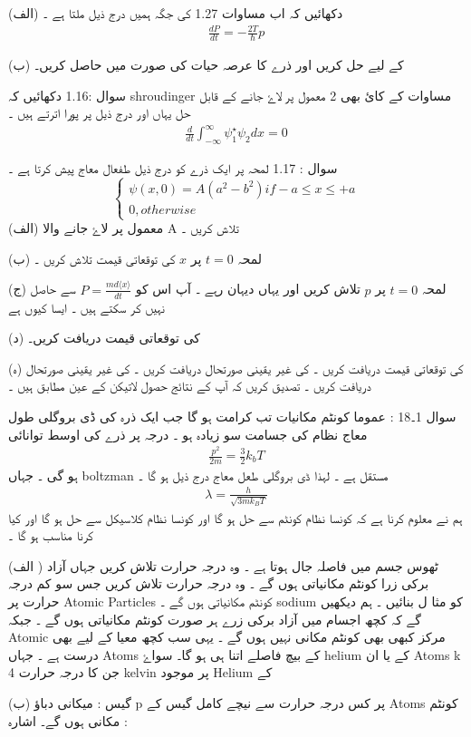 (الف) دکھائیں کہ اب مساوات 1.27 کی جگہ ہمیں درج ذیل ملتا ہے ۔  
\begin{align}
\frac{ dP }{ dt } = -\frac{ 2T }{ \hbar } p
\end{align}

(ب)
کے لیے حل کریں اور ذرے کا عرصہ حیات  
کی صورت میں حاصل کریں۔

سوال :1.16
دکھائیں کہ shroudinger مساوات کے کائ بھی 2 معمول پر لاۓ جانے کے قابل حل یہاں 
اور 
درج ذیل پر پورا اترتے ہیں ۔ 
\begin{align}
\frac{ d }{ dt } \int_{ - \infty }^{ \infty } \psi_1^\star \psi_2 dx = 0
\end{align}

سوال : 1.17
لمحہ 
پر ایک ذرے کو درج ذیل طفعال معاج پیش کرتا ہے ۔ 
$$ \begin{cases}
\psi ( x , 0 ) = A( a^2  - b^2 )  if  -a \leq x \leq +a \\
0 , otherwise 
\end{cases}$$
(الف) معمول پر لاۓ جانے والا A تلاش کریں ۔ 

(ب) لمحہ 
$ t = 0 $
پر 
$ x $ 
کی توقعاتی قیمت تلاش کریں ۔

(ج) لمحہ 
$ t = 0 $
پر
$ p $
تلاش کریں  اور یہاں دیہان رہے ۔ آپ اس کو 
$ P = \frac{ md \langle x \rangle }{ dt } $
 سے حاصل نہیں کر سکتے ہیں ۔ ایسا کیوں ہے 

(د) 
کی توقعاتی قیمت دریافت کریں۔ 

(ہ) 
کی توقعاتی قیمت دریافت کریں ۔ 
کی غیر یقینی صورتحال دریافت کریں ۔ 
کی غیر یقینی صورتحال دریافت کریں ۔ تصدیق کریں کہ آپ کے نتائج حصول  لاتیکن کے عین مطابق ہیں ۔

سوال 1۔18 : 
عموما کونٹم مکانیات تب کرامت ہو گا جب  ایک ذرہ کی ڈی بروگلی طول معاج نظام کی جسامت سو زیادہ ہو ۔ درجہ  
پر ذرے کی اوسط توانائی 
\begin{align}
\frac{ p^2 }{ 2 m } =  \frac{ 3 }{ 2 } k_b T
\end{align}
ہو گی ۔ جہاں 
boltzman مستقل ہے ۔ 
لہذا ڈی بروگلی طعل معاج درج ذیل ہو گا ۔
\begin{align}
\lambda = \frac{ h }{ \sqrt{ 3 m k_B T } }
\end{align}
ہم نے معلوم کرنا ہے کہ کونسا نظام کونٹم سے حل ہو گا اور کونسا نظام کلاسیکل سے حل ہو گا اور کیا کرنا مناسب ہو گا ۔ 

(الف ) ٹھوس جسم میں فاصلہ جال
ہوتا ہے ۔ وہ درجہ حرارت تلاش کریں  جہاں آزاد برکی زرا کونٹم مکانیاتی ہوں گے ۔ وہ درجہ حرارت تلاش کریں جس سو کم درجہ حرارت پر Atomic Particles کونٹم مکانیاتی ہوں گے ۔ sodium کو مثا ل بنائیں ۔ ہم دیکھیں گے کہ کچھ اجسام میں آزاد برکی زرے ہر صورت کونٹم مکانیاتی ہوں گے ۔  جبکہ Atomic مرکز کبھی بھی کونٹم مکانی نہیں ہوں گے ۔ یہی سب کچھ  معیا کے لیے بھی درست ہے ۔ جہاں Atoms کے بیچ فاصلے اتنا ہی ہو گا۔ سواۓ helium کے یا ان Atoms k جن کا  درجہ حرارت 4 kelvin پر موجود Helium کے 

(ب) گیس : میکانی دباؤ p پر کس درجہ حرارت سے نیچے کامل گیس کے Atoms کونٹم مکانی ہوں گے۔ اشارہ : 
